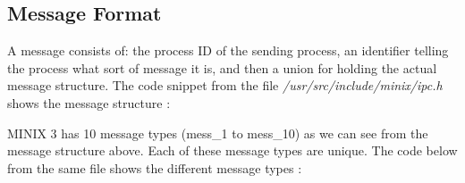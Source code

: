 \subsection{Message Format}

A message consists of: the process ID of the sending process, an identifier telling the process what sort of message it is, and then a union for holding the actual message structure. The code snippet from the file  \emph{/usr/src/include/minix/ipc.h} shows the message structure :




MINIX 3 has 10 message types (mess\_1 to mess\_10) as we can see from the message structure above. Each of these message types are unique. The code below from the same file shows the different message types :



